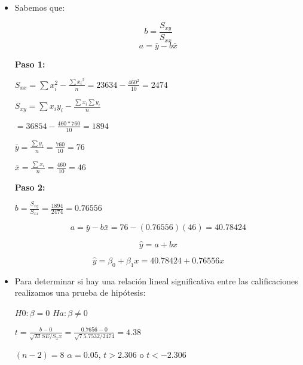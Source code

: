 \documentclass{../oxmathproblems}
\begin{document}
\begin{questions}


\miquestion 
\begin{itemize}
\item 
Sabemos que: 


$$ b = \frac{S_{xy}}{S_{xx}} $$   
$$a = \bar{y} - b\bar{x}$$


\textbf {Paso 1: }

$ S_{xx} = \sum{x_i^2} - \frac{\sum{x_i}^2}{n} = 23 634 - \frac{460^2}{10} = 2474$

$ S_{xy} = \sum{x_iy_i} - \frac{\sum{x_i}\sum{y_i}}{n} $

$ = 36 854 - \frac{460*760}{10} = 1894 $ 


$ \bar{y} = \frac{\sum{y_i}}{n} = \frac{760}{10} = 76 $ 

$  \bar{x} = \frac{\sum{x_i}}{n} = \frac{460}{10} = 46$ 


\textbf {Paso 2: }

$ b = \frac{S_{xy}}{S_{xx}}  = \frac{1894}{2474} = 0.76556 $


$$a = \bar{y} - b\bar{x} = 76 - (0.76556)(46) = 40.78424 $$



$$ \hat{y} = a + bx $$  

 
$$ \hat{y} = \beta_0 + \beta_1x = 40.78424 + 0.76556x$$ 

\item Para determinar si hay una relación lineal significativa entre las calificaciones realizamos una prueba de hipótesis: 


$H0: \beta = 0$   $Ha: \beta  \neq 0$



$ t = \frac{b- 0}{\sqrt MSE/S_xx} = \frac{0.7656 - 0}{\sqrt 75.7532/2474} = 4.38 $ 

  $(n-2) = 8$   $ \alpha = 0.05$,  $t > 2.306$  o $t < -2.306$ 


\end{itemize}
\end{questions}
\end{document}
